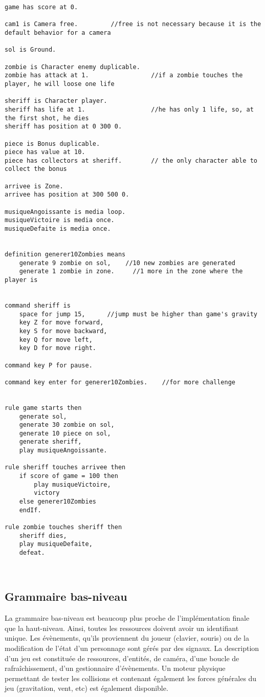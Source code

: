 \begin{lstlisting}[language=GameGrammar]
game has score at 0.

cam1 is Camera free.         //free is not necessary because it is the default behavior for a camera

sol is Ground.

zombie is Character enemy duplicable. 
zombie has attack at 1.                 //if a zombie touches the player, he will loose one life

sheriff is Character player.
sheriff has life at 1.                  //he has only 1 life, so, at the first shot, he dies
sheriff has position at 0 300 0.

piece is Bonus duplicable.
piece has value at 10.
piece has collectors at sheriff.        // the only character able to collect the bonus

arrivee is Zone.
arrivee has position at 300 500 0.

musiqueAngoissante is media loop.
musiqueVictoire is media once.
musiqueDefaite is media once.


definition generer10Zombies means
	generate 9 zombie on sol,    //10 new zombies are generated
	generate 1 zombie in zone.     //1 more in the zone where the player is


command sheriff is 
	space for jump 15,      //jump must be higher than game's gravity
	key Z for move forward, 
	key S for move backward, 
	key Q for move left,
	key D for move right.

command key P for pause.

command key enter for generer10Zombies.    //for more challenge


rule game starts then 
	generate sol,
	generate 30 zombie on sol,
	generate 10 piece on sol,
	generate sheriff,
	play musiqueAngoissante.

rule sheriff touches arrivee then 
	if score of game = 100 then 
		play musiqueVictoire,
		victory
	else generer10Zombies
	endIf.

rule zombie touches sheriff then 
	sheriff dies,
	play musiqueDefaite,
	defeat.



\end{lstlisting}

\subsection{Grammaire bas-niveau}

La grammaire bas-niveau est beaucoup plus proche de l'implémentation finale que la haut-niveau.
Ainsi, toutes les ressources doivent avoir un identifiant unique. Les évènements, qu'ils proviennent du joueur (clavier, souris) ou de la modification
de l'état d'un personnage sont gérés par des signaux.
La description d'un jeu est constituée de ressources, d'entités, de caméra, d'une boucle de rafraîchissement, d'un gestionnaire d'évènements.
Un moteur physique permettant de tester les collisions et contenant également les forces générales du jeu (gravitation, vent, etc) est également disponible.

